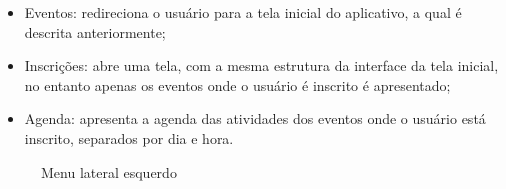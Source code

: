 \begin{itemize}
    \item Eventos: redireciona o usuário para a tela inicial do aplicativo, a qual é descrita anteriormente;
    \item Inscrições: abre uma tela, com a mesma estrutura da interface da tela inicial, no entanto apenas os eventos onde o usuário é inscrito é apresentado;
    \item Agenda: apresenta a agenda das atividades dos eventos onde o usuário está inscrito, separados por dia e hora.
\end{itemize}

\begin{figure}[H]
    \centering
    \caption{Menu lateral esquerdo}
    \label{fig:audiencia3}
\end{figure}

